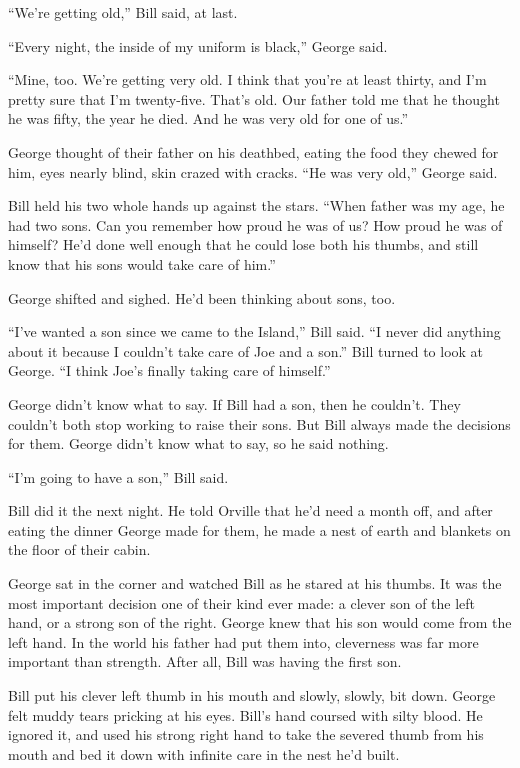 ``We're getting old,'' Bill said, at last.

``Every night, the inside of my uniform is black,'' George said.

``Mine, too. We're getting very old. I think that you're at least thirty, and 
I'm pretty sure that I'm twenty-five. That's old. Our father told me that he 
thought he was fifty, the year he died. And he was very old for one of us.''

George thought of their father on his deathbed, eating the food
they chewed for him, eyes nearly blind, skin crazed with cracks.
``He was very old,'' George said.

Bill held his two whole hands up against the stars.
``When father was my age, he had two sons. Can you remember how proud he was of 
us? How proud he was of himself? He'd done well enough that he could lose both 
his thumbs, and still know that his sons would take care of him.''

George shifted and sighed. He'd been thinking about sons, too.

``I've wanted a son since we came to the Island,'' Bill said.
``I never did anything about it because I couldn't take care of Joe and a son.''
Bill turned to look at George.
``I think Joe's finally taking care of himself.''

George didn't know what to say. If Bill had a son, then he
couldn't. They couldn't both stop working to raise their sons. But
Bill always made the decisions for them. George didn't know what to
say, so he said nothing.

``I'm going to have a son,'' Bill said.

\tb

Bill did it the next night. He told Orville that he'd need a month
off, and after eating the dinner George made for them, he made a
nest of earth and blankets on the floor of their cabin.

George sat in the corner and watched Bill as he stared at his
thumbs. It was the most important decision one of their kind ever
made: a clever son of the left hand, or a strong son of the right.
George knew that his son would come from the left hand. In the
world his father had put them into, cleverness was far more
important than strength. After all, Bill was having the first son.

Bill put his clever left thumb in his mouth and slowly, slowly, bit
down. George felt muddy tears pricking at his eyes. Bill's hand
coursed with silty blood. He ignored it, and used his strong right
hand to take the severed thumb from his mouth and bed it down with
infinite care in the nest he'd built.


